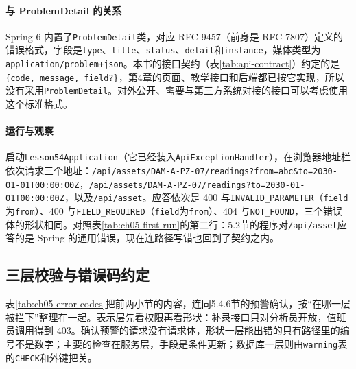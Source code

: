 \paragraph{与 ProblemDetail 的关系}Spring 6 内置了\texttt{ProblemDetail}类，对应 RFC 9457（前身是 RFC 7807）定义的错误格式，字段是\texttt{type}、\texttt{title}、\texttt{status}、\texttt{detail}和\texttt{instance}，媒体类型为\texttt{application/problem+json}。本书的接口契约（表\ref{tab:api-contract}）约定的是\texttt{\{code, message, field?\}}，第4章的页面、教学接口和后端都已按它实现，所以没有采用\texttt{ProblemDetail}。对外公开、需要与第三方系统对接的接口可以考虑使用这个标准格式。

\paragraph{运行与观察}启动\texttt{Lesson54Application}（它已经装入\texttt{ApiExceptionHandler}），在浏览器地址栏依次请求三个地址：\texttt{/api/assets/DAM-A-PZ-07/readings?from=abc\&to=2030-01-01T00:00:00Z}，\texttt{/api/assets/DAM-A-PZ-07/readings?to=2030-01-01T00:00:00Z}，以及\texttt{/api/asset}。应答依次是 400 与\texttt{INVALID\_PARAMETER}（\texttt{field}为\texttt{from}）、400 与\texttt{FIELD\_REQUIRED}（\texttt{field}为\texttt{from}）、404 与\texttt{NOT\_FOUND}，三个错误体的形状相同。对照表\ref{tab:ch05-first-run}的第二行：5.2节的程序对\texttt{/api/asset}应答的是 Spring 的通用错误，现在连路径写错也回到了契约之内。

\subsection{三层校验与错误码约定}

表\ref{tab:ch05-error-codes}把前两小节的内容，连同5.4.6节的预警确认，按“在哪一层被拦下”整理在一起。表示层先看权限再看形状：补录接口只对分析员开放，值班员调用得到 403。确认预警的请求没有请求体，形状一层能出错的只有路径里的编号不是数字；主要的检查在服务层，手段是条件更新；数据库一层则由\texttt{warning}表的\texttt{CHECK}和外键把关。

